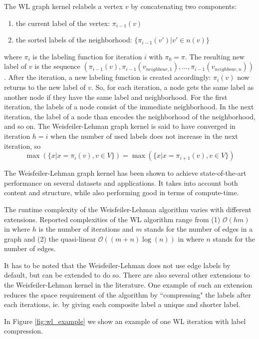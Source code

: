 The WL graph kernel relabels a vertex $v$ by concatenating two components:
\begin{enumerate}
    \item{the current label of the vertex: $\pi_{i-1}(v)$}
    \item{the sorted labels of the neighborhood: $\{ \pi_{i-1}(v') | v' \in n(v) \}$}
\end{enumerate}
where $\pi_{i}$ is the labeling function for iteration $i$ with $\pi_0 = \pi$.
The resulting new label of $v$ is the sequence $(\pi_{i-1}(v), \pi_{i-1}(v_{neighbour,1}), \dots , \pi_{i-1}(v_{neighbour,n}))$.
After the iteration, a new labeling function is created accordingly: $\pi_i(v)$ now returns to the new label of $v$.
So, for each iteration, a node gets the same label as another node if they have the same label and neighborhood.
For the first iteration, the labels of a node consist of the immediate neighborhood.
In the next iteration, the label of a node than encodes the neighborhood of the neighborhood, and so on.
The Weisfeiler-Lehman graph kernel is said to have converged in iteration $h = i$ when the number of used labels does not increase in the next iteration, so
\begin{equation*}
\max(\{x | x = \pi_{i}(v), v \in V\}) = \max(\{x | x = \pi_{i  + 1}(v), v \in V\})
\end{equation*}

The Weisfeiler-Lehman graph kernel has been shown to achieve state-of-the-art performance on several datasets and applications.
It takes into account both content and structure, while also performing good in terms of compute-time.

The runtime complexity of the Weisfeiler-Lehman algorithm varies with different extensions.
Reported complexities of the WL algorithm range from (1) $\mathcal{O}(hm)$ in \cite{Shervashidze2009} where $h$ is the number of iterations and $m$ stands for the number of edges in a graph and (2) the quasi-linear $\mathcal{O}((m + n) \log(n))$ in \cite{Kersting2013} where $n$ stands for the number of edges.

It has to be noted that the Weisfeiler-Lehman does not use edge labels by default, but can be extended to do so.
There are also several other extensions to the Weisfeiler-Lehman kernel in the literature.
One example of such an extension reduces the space requirement of the algorithm by ``compressing" the labels after each iterations, ie. by giving each composite label a unique and shorter label.

In Figure \ref{fig:wl_example} we show an example of one WL iteration with label compression.

